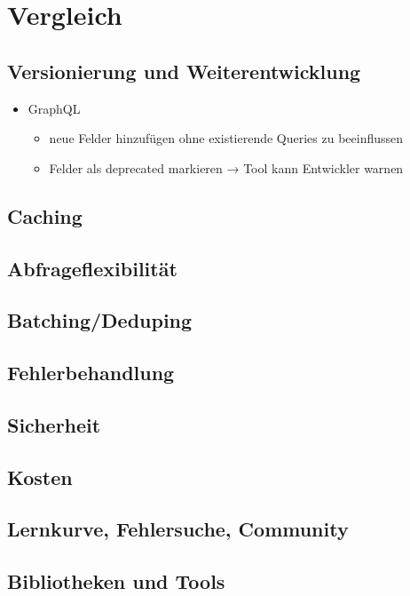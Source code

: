 \section{Vergleich}

\subsection{Versionierung und Weiterentwicklung}
\begin{itemize}
  \item GraphQL
  \begin{itemize}
    \item neue Felder hinzufügen ohne existierende Queries zu beeinflussen
    \item Felder als deprecated markieren → Tool kann Entwickler warnen
  \end{itemize}
\end{itemize}

\subsection{Caching}

\subsection{Abfrageflexibilität}

\subsection{Batching/Deduping}

\subsection{Fehlerbehandlung}

\subsection{Sicherheit}

\subsection{Kosten}

\subsection{Lernkurve, Fehlersuche, Community}

\subsection{Bibliotheken und Tools}
